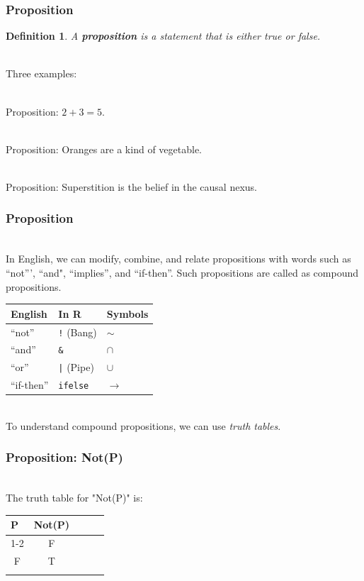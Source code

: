 \documentclass[aspectratio=169, handout]{beamer}
\newtheorem{defn}{Definition}
\numberwithin{equation}{section}
\begin{document}
\begin{frame}
\frametitle{Proposition}

\begin{defn}
A \textbf{proposition} is a statement that is either true or false.
\end{defn} \pause

\ \\Three examples: \pause

\ \\Proposition: $2 + 3 = 5$. \pause

\ \\Proposition: Oranges are a kind of vegetable. \pause

\ \\Proposition: Superstition is the belief in the causal nexus.

\end{frame}



\begin{frame}
\frametitle{Proposition}

\ \\In English, we can modify, combine, and relate propositions with words such as ``not''', ``and", ``implies'', and ``if-then''. Such propositions are called as compound propositions. \pause
\begin{table}[]
\begin{tabular}{lll}
English&In R& Symbols \\
\hline
``not'' &\texttt{!} (Bang) & $\sim$\\
``and'' & \texttt{\&} & $\cap$\\
``or'' & \texttt{|} (Pipe)& $\cup$\\
``if-then'' & \texttt{ifelse}& $\rightarrow$ \\
\end{tabular}
\end{table} \pause
\ \\To understand compound propositions, we can use \emph{truth tables}.

\end{frame}



\begin{frame}
\frametitle{Proposition: Not(P)}

\ \\The truth table for "Not(P)" is:

\begin{table}[]
\begin{tabular}{lllll}
P                     & Not(P)                &  &  &  \\ \cline{1-2}
\multicolumn{1}{c}{T} & \multicolumn{1}{c}{F} &  &  &  \\
\multicolumn{1}{c}{F} & \multicolumn{1}{c}{T} &  &  &  \\
                      &                       &  &  & 
\end{tabular}
\end{table}



\end{frame}
\end{document}
